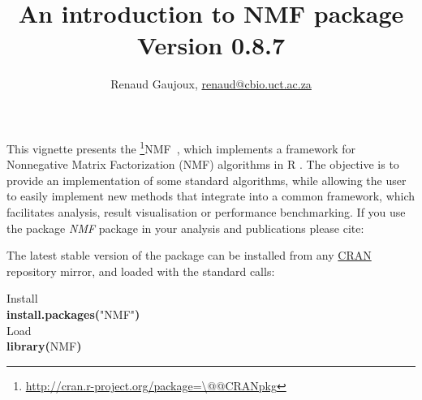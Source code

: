\documentclass[a4paper]{article}\usepackage{graphicx, color}
\makeatletter
\newcommand{\hlfunctioncall}[1]{\textcolor[rgb]{0.501960784313725,0,0.329411764705882}{\textbf{#1}}}%
\newcommand{\hlstring}[1]{\textcolor[rgb]{0.6,0.6,1}{#1}}%
\newcommand{\hlkeyword}[1]{\textcolor[rgb]{0,0,0}{\textbf{#1}}}%
\newcommand{\hlcomment}[1]{\textcolor[rgb]{0.180392156862745,0.6,0.341176470588235}{#1}}%
\newcommand{\hlsymbol}[1]{\textcolor[rgb]{0,0,0}{#1}}%
\newcommand{\hlstd}[1]{\textcolor[rgb]{0,0,0}{#1}}%
\newenvironment{kframe}{%
 \def\FrameCommand##1{\hskip\@totalleftmargin \hskip-\fboxsep
 \colorbox{shadecolor}{##1}\hskip-\fboxsep
     \hskip-\linewidth \hskip-\@totalleftmargin \hskip\columnwidth}%
 \MakeFramed {\advance\hsize-\width
   \@totalleftmargin\z@ \linewidth\hsize
   \@setminipage}}%
 {\par\unskip\endMakeFramed}
\newenvironment{knitrout}{}{} %
\newcommand{\pkgname}[1]{\textit{#1}\xspace}
\newcommand{\Rpkg}[1]{\pkgname{#1} package\xspace}
\newcommand{\CRANurl}[1]{\url{http://cran.r-project.org/package=#1}}
\def\CRANpkg{\@ifstar\@CRANpkg\@@CRANpkg}
\def\@CRANpkg#1{\href{http://cran.r-project.org/package=#1}{\pkgname{#1}}\footnote{\CRANurl{#1}}}
\def\@@CRANpkg#1{\href{http://cran.r-project.org/package=#1}{\pkgname{#1}} package\footnote{\CRANurl{#1}}}
\newcommand{\citeCRANpkg}[1]{\CRANpkg{#1}~\cite{#1}}
\newcommand{\nmfpack}{\Rpkg{NMF}}
\makeatother
\begin{document}




\title{An introduction to NMF package\\\small Version
0.8.7}
\author{Renaud Gaujoux, \url{renaud@cbio.uct.ac.za}}

\maketitle

This vignette presents the \citeCRANpkg{NMF}, which implements a framework
for Nonnegative Matrix Factorization (NMF) algorithms in R \cite{R}.
The objective is to provide an implementation of some standard algorithms, while
allowing the user to easily implement new methods that integrate into a
common framework, which facilitates analysis, result visualisation or
performance benchmarking.
If you use the package \nmfpack in your analysis and publications please cite:

\bigskip
{}

The latest stable version of the package can be installed from any
\href{http://cran.r-project.org}{CRAN} repository mirror, and loaded with the
standard calls:
\begin{knitrout}
\color{fgcolor}\begin{kframe}
\begin{flushleft}
\ttfamily\noindent
\hlcomment{\usebox{\hlnormalsizeboxhash}{\ }Install}\hspace*{\fill}\\
\hlstd{}\hlfunctioncall{install.packages}\hlkeyword{(}\hlstring{"{}NMF"{}}\hlkeyword{)}\hspace*{\fill}\\
\hlstd{}\hlcomment{\usebox{\hlnormalsizeboxhash}{\ }Load}\hspace*{\fill}\\
\hlstd{}\hlfunctioncall{library}\hlkeyword{(}\hlsymbol{NMF}\hlkeyword{)}\mbox{}
\normalfont
\end{flushleft}
\end{kframe}
\end{knitrout}
\end{document}
